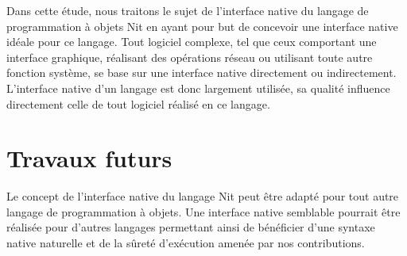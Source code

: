 \begin{conclusion}

Dans cette étude, nous traitons le sujet de l'interface native du langage de programmation à objets Nit en ayant pour but de concevoir une interface native idéale pour ce langage. Tout logiciel complexe, tel que ceux comportant une interface graphique, réalisant des opérations réseau ou utilisant toute autre fonction système, se base sur une interface native directement ou indirectement. L'interface native d'un langage est donc largement utilisée, sa qualité influence directement celle de tout logiciel réalisé en ce langage.

\section*{Travaux futurs}

Le concept de l'interface native du langage Nit peut être adapté pour tout autre langage de programmation à objets. Une interface native semblable pourrait être réalisée pour d'autres langages permettant ainsi de bénéficier d'une syntaxe native naturelle et de la sûreté d'exécution amenée par nos contributions.

\end{conclusion}

